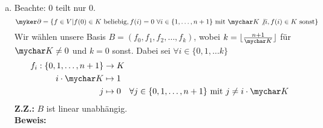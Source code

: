 \documentclass{article}
\begin{document}
\begin{enumerate}[(a)]
\begin{comment}
				\begin{align*}
					\sum_{i=0}^{k} \alpha_if_i &= 0_v
					\intertext{Für alle $j \in \{0,1,\dots, n+1\}$ muss also der Funktionswert der Nullabbildung $0$ sein}
					\sum_{i=0}^{k} \alpha_if_i(j) &= 0&&\forall j\in \{0,1,\dots, n+1\}
					\intertext{Insbesondere muss der Funktionswert von $j\cdot \mychar K\quad \forall j\in \{0,1,\dots, k\}$ $0$ sein.}
					\sum_{i=0}^{k} \alpha_if_i(j\cdot \mychar K) &= 0&&\forall j\in \{0,1,\dots, k\}
					\intertext{$f_i(j\cdot \mychar K) = 0 \forall i\neq j$ und $f_i(j\cdot \mychar K) = 1$ für $i=j$.}
					\alpha_if_i(j\cdot \mychar K) &= 0 &&\forall j\in \{0,1,\dots, k\}\\
					\alpha_j &= 0 &&\forall j\in \{0,1,\dots, k\}
 				\end{align*}
				\textbf{Z.Z.:} $B$ ist ein Erzeugendensystem von $\myker \partial$.\\
				\textbf{Beweis:} Sei $g\in \myker \partial$. Dann ist
				\begin{align*}
					g:\{0,1,\dots, n+1\}&\to K\\
					0\cdot \mychar K&\mapsto l_0\in K\\
					1\cdot \mychar K&\mapsto l_1\in K\\
					&\vdots\\
					k\cdot \mychar K&\mapsto l_k\in K\\
					i&\mapsto 0\quad\forall i \in\{0,1,\dots, n+1\}\text{ mit } \mychar K\not |i
				\end{align*}
				Daher ist $g= \sum_{i=0}^{k}l_if_i$.
		\end{enumerate}
		\end{comment}
	\item Beachte: 0 teilt nur 0.
	$$\myker \partial = \{ f\in V|f(0) \in K\text{ beliebig}, f(i) = 0\ \forall i\in \{1,\dots, n+1\}\text{ mit } \mychar K \not | i, f(i)\in K \text{ sonst}\}$$
	Wir wählen unsere Basis $B = (f_0, f_1, f_2, \dots, f_k)$, wobei $k = \lfloor \frac{n+1}{\mychar K}\rfloor$ für $\mychar K\neq 0$ und $k = 0$ sonst. 
	Dabei sei $\forall i\in \{0,1,\dots k\}$
	\begin{align*}
	f_i:\{0,1,\dots, n+1\} &\to K\\
	i\cdot \mychar K&\mapsto 1\\
	j&\mapsto 0\quad\forall j \in\{0,1,\dots, n+1\}\text{ mit } j\neq i\cdot \mychar K
	\end{align*}
	\textbf{Z.Z.:} $B$ ist linear unabhängig.\\
	\textbf{Beweis:}
	\begin{align*}

\end{align*}
\end{enumerate}
\end{document}
